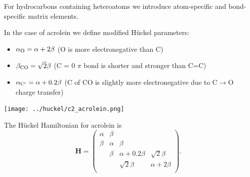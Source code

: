 \documentclass[../Main/chem532-notes.tex]{subfiles}
\begin{document}
For hydrocarbons containing heteroatoms we introduce atom-specific and bond-specific matrix elements.
\begin{example}[Acrolein]

In the case of acrolein we define modified H\"{u}ckel parameters:
\begin{itemize}
\item $\alpha_{\rm O} = \alpha + 2 \beta$	(O is more electronegative than C)
\item $\beta_{\rm CO} = \sqrt{2} \beta$	(C = 0 $\pi$ bond is shorter and stronger than C=C)
\item $\alpha_{\rm C'} = \alpha + 0.2 \beta$	(C of CO is slightly more electronegative due to C$\rightarrow$O charge transfer)
\end{itemize}

\begin{center}
\texttt{[image: ../huckel/c2\_acrolein.png]}
\end{center}
The H\"{u}ckel Hamiltonian for acrolein is
\begin{equation}
\mathbf{H}
=
\begin{pmatrix}
\alpha & \beta & & \\
\beta & \alpha & \beta & \\
& \beta & \alpha + 0.2 \beta & \sqrt{2} \beta \\
& &  \sqrt{2} \beta & \alpha + 2 \beta \\
\end{pmatrix}.
\end{equation}

\end{example}
\end{document}
